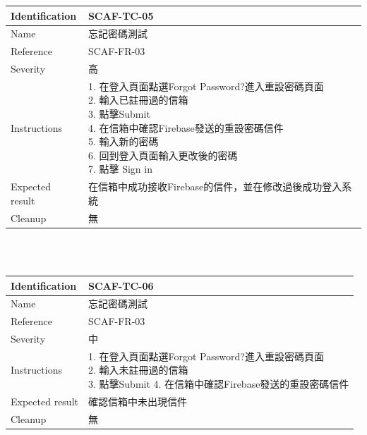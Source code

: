 \documentclass{report}
\begin{document}
\begin{tabularx}{\textwidth}{
  |p{}%
  |p{}|%
  }
  \hline
  \centering Identification &  SCAF-TC-05 \\
  \hline
  \centering Name & 忘記密碼測試 \\
  \hline
  \centering Reference & SCAF-FR-03 \\
  \hline
  \centering Severity & 高 \\
  \hline
  \centering Instructions & 
  \makecell[l]{
    1. 在登入頁面點選Forgot Password?進入重設密碼頁面 \\
    2. 輸入已註冊過的信箱  \\
    3. 點擊Submit \\
    4. 在信箱中確認Firebase發送的重設密碼信件 \\
    5. 輸入新的密碼 \\
    6. 回到登入頁面輸入更改後的密碼  \\
    7. 點擊 Sign in
  }\\
  \hline
  \centering Expected result & 在信箱中成功接收Firebase的信件，並在修改過後成功登入系統 \\
  \hline
  \centering Cleanup & 無 \\
  \hline
\end{tabularx}
\\
\newline
\\
\begin{tabularx}{\textwidth}{
  |p{}%
  |p{}|%
  }
  \hline
  \centering Identification &  SCAF-TC-06 \\
  \hline
  \centering Name & 忘記密碼測試 \\
  \hline
  \centering Reference & SCAF-FR-03 \\
  \hline
  \centering Severity & 中 \\
  \hline
  \centering Instructions & 
  \makecell[l]{
    1. 在登入頁面點選Forgot Password?進入重設密碼頁面 \\
    2. 輸入未註冊過的信箱  \\
    3. 點擊Submit
    4. 在信箱中確認Firebase發送的重設密碼信件
  }\\
  \hline
  \centering Expected result & 確認信箱中未出現信件 \\
  \hline
  \centering Cleanup & 無 \\
  \hline
\end{tabularx}
\end{document}
